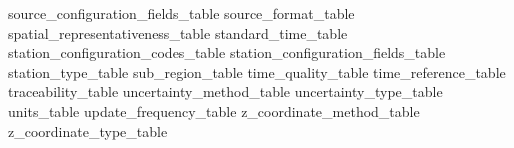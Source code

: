 \documentclass[a4paper,12pt]{article}
\begin{document}
 {source_configuration_fields_table} %
 {source_format_table} %
 {spatial_representativeness_table} %
 {standard_time_table} %
 {station_configuration_codes_table} %
 {station_configuration_fields_table} %
 {station_type_table} %
 {sub_region_table} %
 {time_quality_table} %
 {time_reference_table} %
 {traceability_table} %
 {uncertainty_method_table}
 {uncertainty_type_table}
 {units_table} %
 {update_frequency_table} %
 {z_coordinate_method_table} %
 {z_coordinate_type_table} %

   \clearpage
   \ifodd\value{page}\hbox{}\vspace*{\fill}\thispagestyle{empty}\newpage\fi


\end{document}
